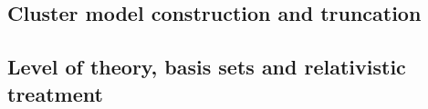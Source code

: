 \subsection{Cluster model construction and truncation}
\label{sec:cluster-model}
%
%

\subsection{Level of theory, basis sets and relativistic treatment}
\label{sec:level-of-theory}

\begin{table}[htbp]
  \centering
  \caption[Computational protocol]{Computational protocol. Charge and spin multiplicity are stated for every species; \CuII{} is a $\mathrm{d}^9$ open-shell doublet and all \CuII{} species were treated with an unrestricted formalism, with $\langle S^2 \rangle$ reported in Appendix~E. Scalar-relativistic effects on \PbII{} are included through the named effective core potential. The decomposition scheme is named together with the program that implemented it.}
  \label{tab:protocol}
\end{table}

